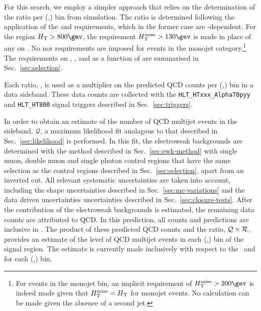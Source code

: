 For this search, we employ a simpler approach that relies on the
determination of the ratio \rmhtmet per (\njet,\scalht) bin from
simulation. The ratio is determined following the application of the
\alphat and \bdphi requirements, which in the former case are
\scalht-dependent. For the region $\scalht > 800\gev$, the requirement
$\mht > 130\gev$ is made in place of any on \alphat. No \alphat nor
\mht requirements are imposed for events in the monojet
category.\footnote{For events in the monojet bin, an implicit
  requirement of $\mht > 200\gev$ is indeed made given that $\mbox{$H_{\rm T}^{\rm miss}$} =
  \mbox{$H_\text{T}$}$ for monojet events. No \alphat calculation can be made
  given the absence of a second jet.} The requirements on \alphat,
\mht, and \bdphi as a function of \scalht are summarised in
Sec.~\ref{sec:selection}. 

Each ratio, \rmhtmet, is used as a
multiplier on the predicted QCD counts per (\njet,\scalht) bin in a
\mhtmet data sideband. 
These data counts are collected with the
\verb!HLT_HTxxx_AlphaT0pyy!  and \verb!HLT_HT800! signal triggers
described in Sec.~\ref{sec:triggers}. 

In order to obtain an estimate of the number
of QCD multijet events in the sideband, $\mathcal{Q}$, a maximum likelihood fit analagous to that
described in Sec.~\ref{sec:likelihood} is performed. In this
fit, the
electroweak backgrounds are determined with the method described in
Sec.~\ref{sec:ewk-method} with single muon, double muon
and single photon control regions that have the same selection as the control regions
described in Sec.~\ref{sec:selection}, apart from an inverted \mhtmet
cut. All relevant systematic uncertainties are taken into account,
including the shape uncertainties described in
Sec.~\ref{sec:mc-variations} and the data driven uncertainties
uncertainties described in Sec.~\ref{sec:closure-tests}. 
After the contribution of the electroweak backgrounds is
estimated, the
remaining data counts are attributed to QCD. In this prediction, all
counts and predictions are inclusive in \nb. The
product of these predicted QCD counts and the ratio, $\mathcal{Q} \times
\mbox{$\mathcal{R}$}$, provides an estimate of the level of QCD multijet events in
each (\njet,\scalht) bin of the signal region. The estimate is
currently made inclusively with respect to the \nb\ and \mht for each
(\njet,\scalht) bin. 

